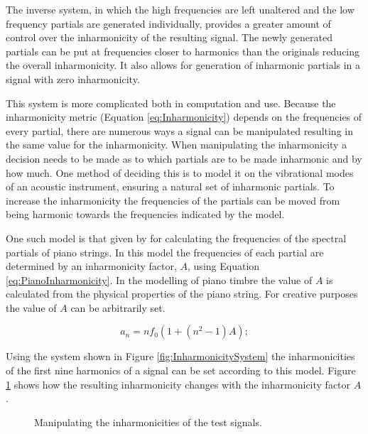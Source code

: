 		The inverse system, in which the high frequencies are left unaltered and the low frequency partials are
		generated individually, provides a greater amount of control over the inharmonicity of the resulting
		signal. The newly generated partials can be put at frequencies closer to harmonics than the originals
		reducing the overall inharmonicity. It also allows for generation of inharmonic partials in a signal with
		zero inharmonicity. 

		This system is more complicated both in computation and use. Because the inharmonicity metric (Equation
		\ref{eq:Inharmonicity}) depends on the frequencies of every partial, there are numerous ways a signal can
		be manipulated resulting in the same value for the inharmonicity. When manipulating the inharmonicity a
		decision needs to be made as to which partials are to be made inharmonic and by how much. One method of
		deciding this is to model it on the vibrational modes of an acoustic instrument, ensuring a natural set of
		inharmonic partials. To increase the inharmonicity the frequencies of the partials can be moved from being
		harmonic towards the frequencies indicated by the model.

		One such model is that given by \citet{rossing2002the} for calculating the frequencies of the spectral
		partials of piano strings. In this model the frequencies of each partial are determined by an inharmonicity
		factor, $A$, using Equation \ref{eq:PianoInharmonicity}. In the modelling of piano timbre the value of $A$
		is calculated from the physical properties of the piano string. For creative purposes the value of $A$ can
		be arbitrarily set.

		\begin{equation}
			a_{n} = nf_{0} \left( 1 + \left( n^{2} - 1 \right) A \right);
			\label{eq:PianoInharmonicity}
		\end{equation}

		Using the system shown in Figure \ref{fig:InharmonicitySystem} the inharmonicities of the first nine
		harmonics of a signal can be set according to this model. Figure \ref{fig:MoveInharmonicities} shows how
		the resulting inharmonicity changes with the inharmonicity factor $A$.

		\begin{figure}[h!]
			\centering
			\resizebox{0.6\textwidth}{!}{}
			\caption{Manipulating the inharmonicities of the test signals.}
			\label{fig:MoveInharmonicities}
		\end{figure}

